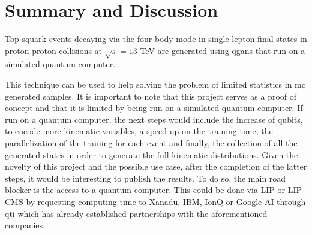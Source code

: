 \section{Summary and Discussion}
\label{sec:sum}

Top squark events decaying via the four-body mode in single-lepton final states 
in proton-proton collisions at $\sqrt{s}=13$ TeV are generated using \glspl{qgan}
that run on a simulated quantum computer. 

This technique can be used to help solving the problem of limited statistics in 
\gls{mc} generated samples. It is important to note that this project serves as 
a proof of concept and that it is limited by being run on a simulated quantum 
computer. If run on a quantum computer, the next steps would include the increase
of qubits, to encode more kinematic variables, a speed up on the training time, 
the parallelization of the training for each event and finally, the collection 
of all the generated states in order to generate the full kinematic distributions. 
Given the novelty of this project and the possible use case, after the completion
of the latter steps, it would be interesting to publish the results. To do so, 
the main road blocker is the access to a quantum computer. This could be done
via LIP or LIP-CMS by requesting computing time to Xanadu, IBM, IonQ or Google AI
through \gls{qti} which has already established partnerships with the 
aforementioned companies.